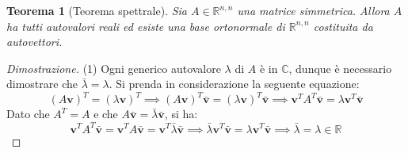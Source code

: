 \documentclass{article}
\newtheorem{theorem}{Teorema}
\begin{document}
    \begin{theorem}[Teorema spettrale]
        Sia $A \in \mathbb{R}^{n, n}$ una matrice simmetrica. Allora $A$ ha tutti autovalori reali ed esiste una base ortonormale di $\mathbb{R}^{n, n}$ costituita da autovettori.
    \end{theorem} 

    \begin{proof}[Dimostrazione]
        (1) Ogni generico autovalore $\lambda$ di $A$ è in $\mathbb{C}$, dunque è necessario dimostrare che $\bar{\lambda} = \lambda$. 
        Si prenda in considerazione la seguente equazione:
        \[
            (A \mathbf{v})^{T} = (\lambda \mathbf{v})^{T} \implies (A \mathbf{v})^{T} \bar{\mathbf{v}} = (\lambda \mathbf{v})^{T} \bar{\mathbf{v}} \implies \mathbf{v}^{T} A^{T} \bar{\mathbf{v}} = \lambda \mathbf{v}^{T} \bar{\mathbf{v}} \tag{1.1}
        \]
        Dato che $A^{T} = A$ e che $A \bar{\mathbf{v}} = \bar{\lambda} \bar{\mathbf{v}}$, si ha:
        \[
            \mathbf{v}^{T} A^{T} \bar{\mathbf{v}} = \mathbf{v}^{T} A \bar{\mathbf{v}} = \mathbf{v}^{T} \bar{\lambda} \bar{\mathbf{v}} \implies \bar{\lambda} \mathbf{v}^{T} \bar{\mathbf{v}} = \lambda \mathbf{v}^{T} \bar{\mathbf{v}} \implies \bar{\lambda} = \lambda \in \mathbb{R} \tag{1.2}
        \]

        \vspace{10pt}
    \end{proof}
\end{document}
